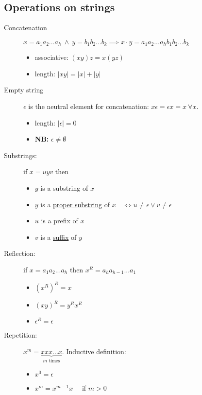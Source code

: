 \documentclass{article}
\begin{document}
\subsection{Operations on strings}
\begin{description}
\item[Concatenation] $x=a_1a_2...a_h \:\wedge \: y=b_1b_2...b_k  \implies  x\cdot y=a_1a_2...a_hb_1b_2...b_k$ 
	\begin{itemize}
	\item associative: $(xy)z=x(yz)$
	\item length: $|xy|=|x|+|y|$
	\end{itemize}
\item[Empty string] $\epsilon$ is the neutral element for concatenation: $x\epsilon = \epsilon x=x\:\forall x$.
	\begin{itemize}
	\item length: $|\epsilon|=0$
	\item \textbf{NB:} $\epsilon \neq \emptyset$
	\end{itemize}
\item[Substrings:] if $x=uyv$ then
	\begin{itemize}
	\item $y$ is a substring of $x$
	\item $y$ is a \underline{proper substring} of $x \quad \iff u\neq \epsilon \vee v\neq \epsilon$
	\item $u$ is a \underline{prefix} of $x$
	\item $v$ is a \underline{suffix} of $y$
	\end{itemize}
\item[Reflection:] if $x=a_1a_2...a_h$ then $x^R=a_ha_{h-1}...a_1$
	\begin{itemize}
	\item $(x^R)^R=x$
	\item $(xy)^R=y^Rx^R$
	\item $\epsilon^R=\epsilon$
	\end{itemize}
\item[Repetition:] $x^m=\underbrace{xxx...x}_{m\text{ times}}$. Inductive definition:
	\begin{itemize}
	\item $x^0=\epsilon$
	\item $x^m=x^{m-1}x \quad$ if $m>0$
	\end{itemize}
\end{description}
	
\end{document}
